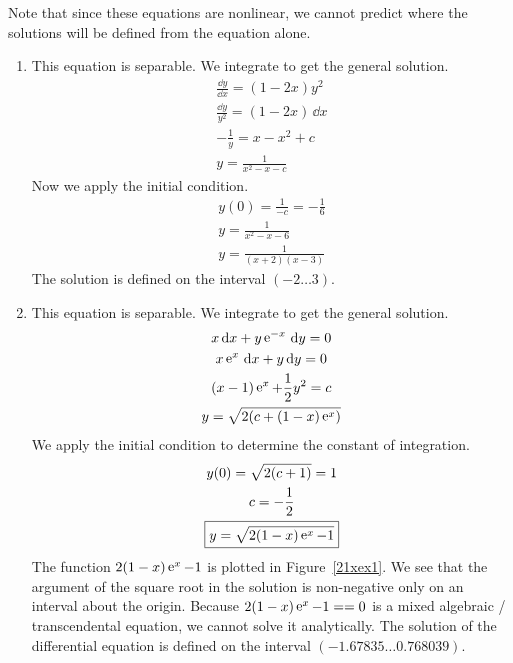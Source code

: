 {  \begin{Solution}
    \label{solution dydx = 1-2x y2}
    Note that since these equations are nonlinear, we cannot predict where the 
    solutions will be defined from the equation alone.
    \begin{enumerate}
    \item
      This equation is separable.  We integrate to get the general solution.
      \begin{gather*}
        \frac{\dd y}{\dd x} = (1-2x) y^2 \\
        \frac{\dd y}{y^2} = (1 - 2 x) \,\dd x \\
        - \frac{1}{y} = x - x^2 + c \\
        y = \frac{1}{x^2 - x - c}
      \end{gather*}
      Now we apply the initial condition.
      \begin{gather*}
        y(0) = \frac{1}{-c} = - \frac{1}{6} \\
        y = \frac{1}{x^2 - x - 6} \\
        \boxed{
          y = \frac{1}{(x+2)(x-3)}
          }
      \end{gather*}
      The solution is defined on the interval $(-2 \ldots 3)$.
    \item
      This equation is separable.  We integrate to get the general solution.
      \begin{gather*}
        x \,\mathrm{d} x + y \mathop{\mathrm{e}}\nolimits^{-x} \,\mathrm{d} y = 0 \\
        x \mathop{\mathrm{e}}\nolimits^x \,\mathrm{d} x + y \,\mathrm{d} y = 0 \\
        (x - 1) \mathop{\mathrm{e}}\nolimits^x + \frac{1}{2} y^2 = c \\
        y = \sqrt{ 2 ( c + (1-x) \mathop{\mathrm{e}}\nolimits^x ) }
      \end{gather*}
      We apply the initial condition to determine the constant of integration.
      \begin{gather*}
        y(0) = \sqrt{ 2 (c + 1) }= 1 \\
        c = - \frac{1}{2} \\
        \boxed{
          y = \sqrt{ 2 (1-x) \mathop{\mathrm{e}}\nolimits^x - 1 }
          }
      \end{gather*}
      The function $2(1-x) \mathop{\mathrm{e}}\nolimits^x - 1$ is plotted in Figure~\ref{21xex1}.  We see that
      the argument of the square root in the solution is non-negative only on 
      an interval about the origin.  Because $2 (1-x) \mathop{\mathrm{e}}\nolimits^x - 1 == 0$ is a mixed
      algebraic / transcendental equation, we cannot solve it analytically.  The
      solution of the differential equation is defined on the interval
      $(-1.67835 \ldots 0.768039)$.


\end{enumerate}
\end{Solution}}
